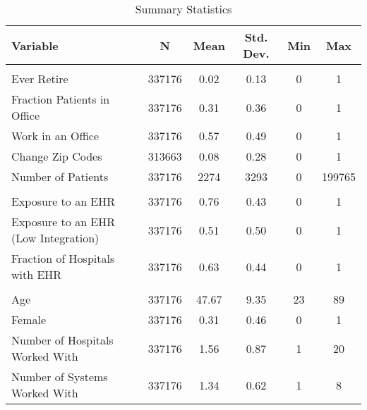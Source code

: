 


\begin{table}[ht]

\caption{Summary Statistics}
\centering
\begin{tabular}[t]{lccccc}
\toprule
Variable & N & Mean & Std. Dev. & Min & Max\\
\midrule
\addlinespace[0.3em]
\multicolumn{6}{l}{\textbf{Outcomes}}\\
\hspace{1em}Ever Retire & 337176 & 0.02 & 0.13 & 0 & 1\\
\hspace{1em}Fraction Patients in Office & 337176 & 0.31 & 0.36 & 0 & 1\\
\hspace{1em}Work in an Office & 337176 & 0.57 & 0.49 & 0 & 1\\
\hspace{1em}Change Zip Codes & 313663 & 0.08 & 0.28 & 0 & 1\\
\hspace{1em}Number of Patients & 337176 & 2274 & 3293 & 0 & 199765\\
\addlinespace[0.3em]
\multicolumn{6}{l}{\textbf{Treatment}}\\
\hspace{1em}Exposure to an EHR & 337176 & 0.76 & 0.43 & 0 & 1\\
\hspace{1em}Exposure to an EHR (Low Integration) & 337176 & 0.51 & 0.50 & 0 & 1\\
\hspace{1em}Fraction of Hospitals with EHR & 337176 & 0.63 & 0.44 & 0 & 1\\
\addlinespace[0.3em]
\multicolumn{6}{l}{\textbf{Characteristics}}\\
\hspace{1em}Age & 337176 & 47.67 & 9.35 & 23 & 89\\
\hspace{1em}Female & 337176 & 0.31 & 0.46 & 0 & 1\\
\hspace{1em}Number of Hospitals Worked With & 337176 & 1.56 & 0.87 & 1 & 20\\
\hspace{1em}Number of Systems Worked With & 337176 & 1.34 & 0.62 & 1 & 8\\
\bottomrule
\end{tabular}
\label{tab:sumstats1}
\end{table}
